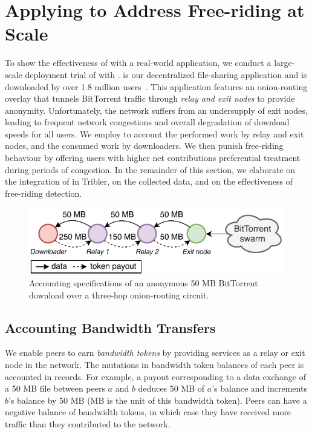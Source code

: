 \section{Applying \ModelName{} to Address Free-riding at Scale}
\label{sec:deployment}
To show the effectiveness of \ModelName{} with a real-world application, we conduct a large-scale deployment trial of \ModelName{} with \Tribler{}.
\Tribler{} is our decentralized file-sharing application and is downloaded by over 1.8 million users~\cite{pouwelse2008tribler}.
This application features an onion-routing overlay that tunnels BitTorrent traffic through \emph{relay and exit nodes} to provide anonymity.
Unfortunately, the \Tribler{} network suffers from an undersupply of exit nodes, leading to frequent network congestions and overall degradation of download speeds for all users.
We employ \ModelName{} to account the performed work by relay and exit nodes, and the consumed work by downloaders.
We then punish free-riding behaviour by offering users with higher net contributions preferential treatment during periods of congestion.
In the remainder of this section, we elaborate on the integration of \ModelName{} in Tribler, on the collected data, and on the effectiveness of free-riding detection.

\begin{figure}[t]
	\centering
	\includegraphics[width=.8\linewidth]{trustchain/assets/payouts}
	\caption{Accounting specifications of an anonymous 50 MB BitTorrent download over a three-hop onion-routing circuit.}
	\label{fig:payouts}
\end{figure}

\subsection{Accounting Bandwidth Transfers}
We enable peers to earn \emph{bandwidth tokens} by providing services as a relay or exit node in the \Tribler{} network.
The mutations in bandwidth token balances of each peer is accounted in \ModelName{} records.
For example, a payout corresponding to a data exchange of a 50 MB file between peers $ a $ and $ b $ deduces 50 MB of $ a $'s balance and increments $ b $'s balance by 50 MB (MB is the unit of this bandwidth token).
Peers can have a negative balance of bandwidth tokens, in which case they have received more traffic than they contributed to the network.

